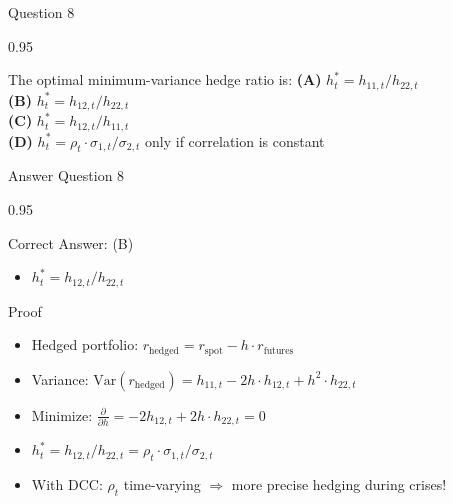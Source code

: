 \documentclass[9pt, aspectratio=169, t]{beamer}
\begin{document}
\begin{frame}{Question 8}
    \begin{cminipage}{0.95\textwidth}
    \begin{block}{The optimal minimum-variance hedge ratio is:}
        \textcolor{MainBlue}{\textbf{(A)}} $h_t^* = h_{11,t} / h_{22,t}$\\[3pt]
        \textcolor{MainBlue}{\textbf{(B)}} $h_t^* = h_{12,t} / h_{22,t}$\\[3pt]
        \textcolor{MainBlue}{\textbf{(C)}} $h_t^* = h_{12,t} / h_{11,t}$\\[3pt]
        \textcolor{MainBlue}{\textbf{(D)}} $h_t^* = \rho_t \cdot \sigma_{1,t} / \sigma_{2,t}$ only if correlation is constant
    \end{block}
    \end{cminipage}
\end{frame}

\begin{frame}{Answer Question 8}
    \begin{cminipage}{0.95\textwidth}
    \begin{exampleblock}{Correct Answer: (B)}
        \begin{itemize}\setlength{\itemsep}{0pt}
            \item $h_t^* = h_{12,t} / h_{22,t}$
        \end{itemize}
    \end{exampleblock}

    \pause
    \begin{block}{Proof}
        \begin{itemize}\setlength{\itemsep}{0pt}
            \item Hedged portfolio: $r_{\text{hedged}} = r_{\text{spot}} - h \cdot r_{\text{futures}}$
            \item Variance: $\text{Var}(r_{\text{hedged}}) = h_{11,t} - 2h \cdot h_{12,t} + h^2 \cdot h_{22,t}$
            \item Minimize: $\frac{\partial}{\partial h} = -2h_{12,t} + 2h \cdot h_{22,t} = 0$
            \item $h_t^* = h_{12,t} / h_{22,t} = \rho_t \cdot \sigma_{1,t}/\sigma_{2,t}$
            \item With DCC: $\rho_t$ time-varying $\Rightarrow$ more precise hedging during crises!
        \end{itemize}
    \end{block}
    \end{cminipage}
\end{frame}
\end{document}
